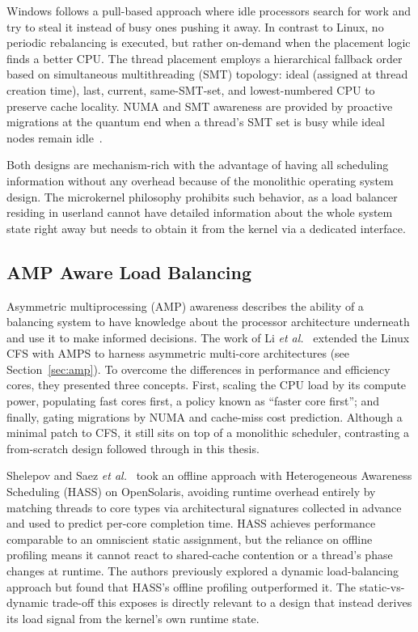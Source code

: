 Windows follows a pull-based approach where idle processors search for work and try to steal it instead of busy ones pushing it away.
In contrast to Linux, no periodic rebalancing is executed, but rather on-demand when the placement logic finds a better CPU.
The thread placement employs a hierarchical fallback order based on simultaneous multithreading (SMT) topology: ideal (assigned at thread creation time), last, current, same-SMT-set, and lowest-numbered CPU to preserve cache locality.
NUMA and SMT awareness are provided by proactive migrations at the quantum end when a thread's SMT set is busy while ideal nodes remain idle~\cite{windows_internals, clr_inside_out}.

Both designs are mechanism-rich with the advantage of having all scheduling information without any overhead because of the monolithic operating system design.
The microkernel philosophy prohibits such behavior, as a load balancer residing in userland cannot have detailed information about the whole system state right away but needs to obtain it from the kernel via a dedicated interface.

\subsection{AMP Aware Load Balancing}

Asymmetric multiprocessing (AMP) awareness describes the ability of a balancing system to have knowledge about the processor architecture underneath and use it to make informed decisions.
The work of Li \textit{et al.}~\cite{faster-core-first} extended the Linux CFS with AMPS to harness asymmetric multi-core architectures (see Section~\ref{sec:amp}).
To overcome the differences in performance and efficiency cores, they presented three concepts.
First, scaling the CPU load by its compute power, populating fast cores first, a policy known as \enquote{faster core first}; and finally, gating migrations by NUMA and cache-miss cost prediction.
Although a minimal patch to CFS, it still sits on top of a monolithic scheduler, contrasting a from-scratch design followed through in this thesis.

Shelepov and Saez \textit{et al.}~\cite{hass-scheduling} took an offline approach with Heterogeneous Awareness Scheduling (HASS) on OpenSolaris, avoiding runtime overhead entirely by matching threads to core types via architectural signatures collected in advance and used to predict per-core completion time.
HASS achieves performance comparable to an omniscient static assignment, but the reliance on offline profiling means it cannot react to shared-cache contention or a thread's phase changes at runtime.
The authors previously explored a dynamic load-balancing approach but found that HASS's offline profiling outperformed it.
The static-vs-dynamic trade-off this exposes is directly relevant to a design that instead derives its load signal from the kernel's own runtime state.

